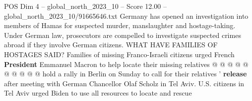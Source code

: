 \begin{textsample}{POS Dim 4 – global\_north\_2023\_10 – Score 12.00 – global\_north\_2023\_10/91665646.txt}
Germany has opened an investigation into members of Hamas for suspected murder, manslaughter and hostage-taking.
Under German law, prosecutors are compelled to investigate suspected crimes abroad if they involve German citizens.
WHAT HAVE FAMILIES OF HOSTAGES SAID?
Families of missing Franco-Israeli citizens urged French \textbf{President} Emmanuel Macron to help locate their missing relatives @ @ @ @ @ @ @ @ @ @ hold a rally in Berlin on Sunday to call for their relatives ' \textbf{release} after meeting with German Chancellor Olaf Scholz in Tel Aviv.
U.S. citizens in Tel Aviv urged Biden to use all resources to locate and rescue

\end{textsample}

